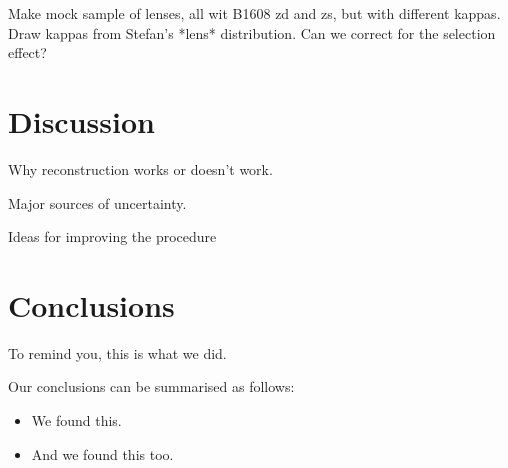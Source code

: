 \documentclass[useAMS,usenatbib]{mn2e}
\begin{document}
Make mock sample of lenses, all wit B1608 zd and zs, but with different kappas.
Draw kappas from Stefan's *lens* distribution. Can we correct for the selection
effect?





\section{Discussion}
\label{sec:discuss}

Why reconstruction works or doesn't work.

Major sources of uncertainty.

Ideas for improving the procedure



\section{Conclusions}
\label{sec:conclude}

To remind you, this is what we did.

Our conclusions can be summarised as follows:

\begin{itemize}

\item We found this.

\item And we found this too.

\end{itemize}


\end{document}
